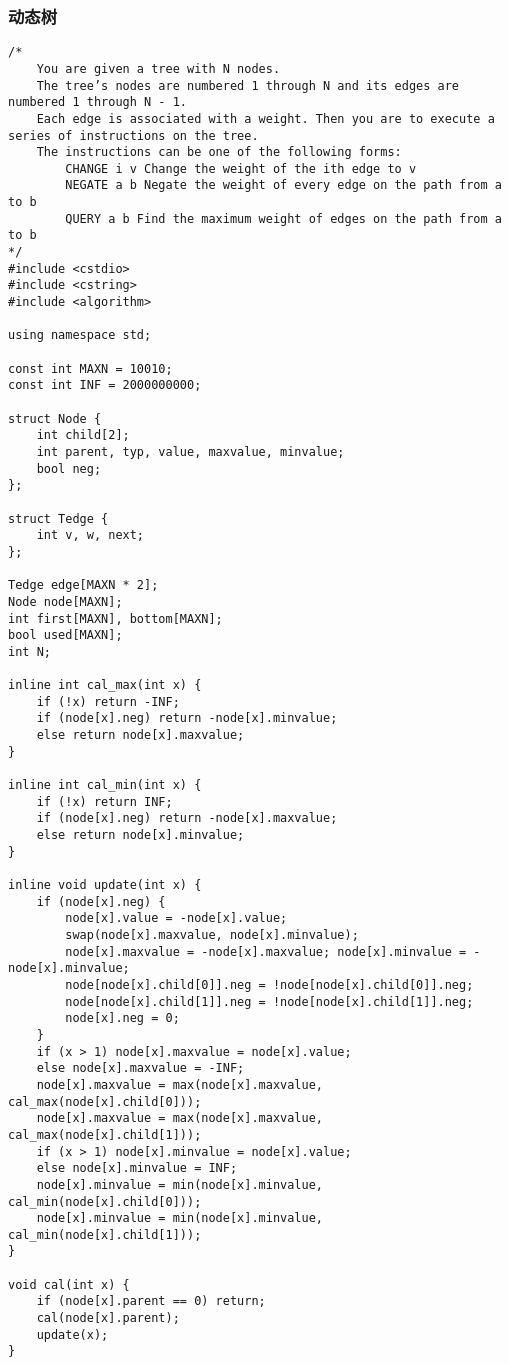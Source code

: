 \subsubsection{动态树}
\begin{verbatim}
/*
    You are given a tree with N nodes.
    The tree’s nodes are numbered 1 through N and its edges are numbered 1 through N - 1.
    Each edge is associated with a weight. Then you are to execute a series of instructions on the tree.
    The instructions can be one of the following forms:
        CHANGE i v Change the weight of the ith edge to v 
        NEGATE a b Negate the weight of every edge on the path from a to b 
        QUERY a b Find the maximum weight of edges on the path from a to b 
*/
#include <cstdio>
#include <cstring>
#include <algorithm>

using namespace std;

const int MAXN = 10010;
const int INF = 2000000000;

struct Node {
    int child[2]; 
    int parent, typ, value, maxvalue, minvalue;
    bool neg;
}; 

struct Tedge {
    int v, w, next;
};

Tedge edge[MAXN * 2];
Node node[MAXN];
int first[MAXN], bottom[MAXN];
bool used[MAXN];
int N;

inline int cal_max(int x) {
    if (!x) return -INF;
    if (node[x].neg) return -node[x].minvalue;
    else return node[x].maxvalue;
}

inline int cal_min(int x) {
    if (!x) return INF;
    if (node[x].neg) return -node[x].maxvalue;
    else return node[x].minvalue;
}

inline void update(int x) {
    if (node[x].neg) {
        node[x].value = -node[x].value;
        swap(node[x].maxvalue, node[x].minvalue);
        node[x].maxvalue = -node[x].maxvalue; node[x].minvalue = -node[x].minvalue;
        node[node[x].child[0]].neg = !node[node[x].child[0]].neg;
        node[node[x].child[1]].neg = !node[node[x].child[1]].neg;
        node[x].neg = 0;
    }
    if (x > 1) node[x].maxvalue = node[x].value;
    else node[x].maxvalue = -INF;
    node[x].maxvalue = max(node[x].maxvalue, cal_max(node[x].child[0]));
    node[x].maxvalue = max(node[x].maxvalue, cal_max(node[x].child[1]));
    if (x > 1) node[x].minvalue = node[x].value;
    else node[x].minvalue = INF;
    node[x].minvalue = min(node[x].minvalue, cal_min(node[x].child[0]));
    node[x].minvalue = min(node[x].minvalue, cal_min(node[x].child[1]));
}

void cal(int x) {
    if (node[x].parent == 0) return;
    cal(node[x].parent);
    update(x);
}


\end{verbatim}
